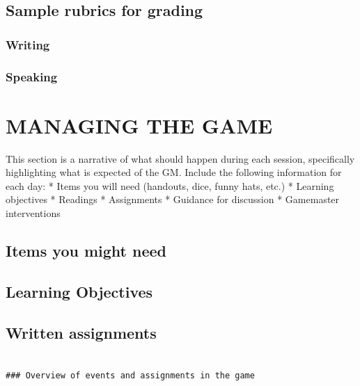 \section{Sample rubrics for grading}
\label{samplerubricsforgrading}

\subsection{Writing}
\label{writing}

\subsection{Speaking}
\label{speaking}

\pagebreak 

\chapter{MANAGING THE GAME}
\label{managingthegame}

This section is a narrative of what should happen during each session, specifically highlighting
what is expected of the GM. Include the following information for each day:
* Items you will need (handouts, dice, funny hats, etc.)
* Learning objectives
* Readings
* Assignments
* Guidance for discussion
* Gamemaster interventions

\section{Items you might need}
\label{itemsyoumightneed}

\section{Learning Objectives}
\label{learningobjectives}

\section{Written assignments}
\label{writtenassignments}

\begin{adjustwidth}{2.5em}{2.5em}
\begin{verbatim}

### Overview of events and assignments in the game

\end{verbatim}
\end{adjustwidth}

